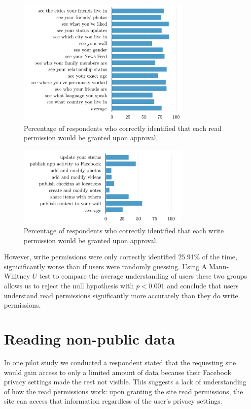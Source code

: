 \documentclass[twoside,letterpaper]{soups-poster}
\begin{document}
\begin{figure}[tbh!]
  \centering
  \includegraphics[width=8.5cm]{read_percents_cosn}
  \caption{Percentage of respondents who correctly identified that each read permission would be granted upon approval.}
  \label{figure:readpercents}
\end{figure}

\begin{figure}[h!]
  \centering
  \includegraphics[width=8.5cm]{write_percents_cosn}
  \caption{Percentage of respondents who correctly identified that each write permission would be granted upon approval.}
  \label{figure:writepercents}
\end{figure}

However, write permissions were only correctly identified 25.91\% of the time, signicificantly worse than if users were randomly guessing.
Using A Mann-Whitney $U$ test to compare the average understanding of users these two groups allows us to reject the null hypothesis with $p < 0.001$ and conclude that users understand read permissions significantly more accurately than they do write permissions.


\section{Reading non-public data}

In one pilot study we conducted a respondent stated that the requesting site would gain access to only a limited amount of data because their Facebook privacy settings made the rest not visible.
This suggests a lack of understanding of how the read permissions work: upon granting the site read permissions, the site can access that information regardless of the user's privacy settings.
\end{document}
